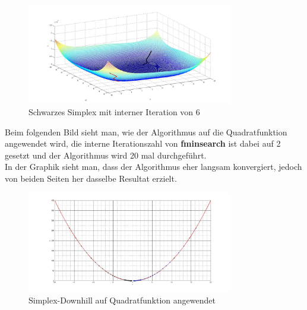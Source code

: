 \begin{figure}[h]
	\centering
	\includegraphics[width=0.8\textwidth]{../bilder/Himmelblau3DSchwarz.jpg}%
  	\caption{Schwarzes Simplex mit interner Iteration von 6}%
	\label{fig:HB3}%
\end{figure}

Beim folgenden Bild sieht man, wie der Algorithmus auf die Quadratfunktion angewendet wird, die interne Iterationszahl von \textbf{fminsearch} ist dabei auf 2 gesetzt und der Algorithmus wird 20 mal durchgeführt.\\
In der Graphik sieht man, dass der Algorithmus eher langsam konvergiert, jedoch von beiden Seiten her dasselbe Resultat erzielt. 
\begin{figure}[h]
	\centering
	\includegraphics[width=0.8\textwidth]{../bilder/Quadrat.jpg}%
  	\caption{Simplex-Downhill auf Quadratfunktion angewendet}%
	\label{fig:SQ1}%
\end{figure}